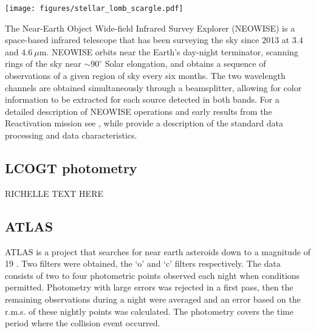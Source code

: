 \documentclass{aa}
\newcommand{\asas}{ASASSN-21qj}
\begin{document}
\begin{figure*}
\begin{centering}
\texttt{[image: figures/stellar\_lomb\_scargle.pdf]}
\caption{ASASSN photometry of \asas\ and the Lomb Scargle periodograms of the photometry in and out of the eclipse.
%
The blue and orange shaded regions in the top panel indicate the range of epochs put into the Lomb Scargle periodogram.
%
Middle panel: The periodograms over a range of 0 to 150 days.
%
Lower panel: The periodogram of the star outside of the eclipse over a range of 0 to 50 days.
}
\label{fig:starlombscargle}
\end{centering}
\end{figure*}
    
The Near-Earth Object Wide-field Infrared Survey Explorer (NEOWISE) is a space-based infrared telescope that has been surveying the sky since 2013 at $3.4$ and $4.6~\mu$m.
%
NEOWISE orbits near the Earth's day-night terminator, scanning rings of the sky near $\sim90^\circ$ Solar elongation, and obtains a sequence of observations of a given region of sky every six months.
%
The two wavelength channels are obtained simultaneously through a beamsplitter, allowing for color information to be extracted for each source detected in both bands.
%
For a detailed description of NEOWISE operations and early results from the Reactivation mission see \citet{mainzer14neowise}, while \citet{cutri15} provide a description of the standard data processing and data characteristics.
%

\subsection{LCOGT photometry}

RICHELLE TEXT HERE

\subsection{ATLAS}

ATLAS is a project that searches for near earth asteroids down to a magnitude of 19 \citep{Tonry18}.
%
Two filters were obtained, the `o' and `c' filters respectively.
%
The data consists of two to four photometric points observed each night when conditions permitted.
%
Photometry with large errors was rejected in a first pass, then the remaining observations during a night were averaged and an error based on the r.m.s. of these nightly points was calculated.
%
The photometry covers the time period where the collision event occurred. 
\end{document}
